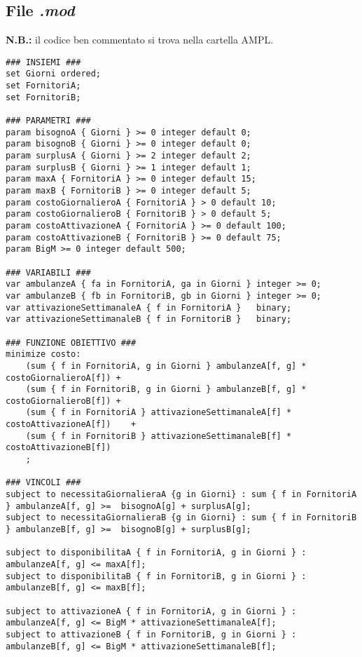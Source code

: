\subsection{File \textit{.mod}}
\textbf{N.B.:} il codice ben commentato si trova nella cartella AMPL.
\begin{lstlisting}
### INSIEMI ###
set Giorni ordered;
set FornitoriA;
set FornitoriB;

### PARAMETRI ###
param bisognoA { Giorni } >= 0 integer default 0;
param bisognoB { Giorni } >= 0 integer default 0;
param surplusA { Giorni } >= 2 integer default 2;
param surplusB { Giorni } >= 1 integer default 1;
param maxA { FornitoriA } >= 0 integer default 15;
param maxB { FornitoriB } >= 0 integer default 5;
param costoGiornalieroA { FornitoriA } > 0 default 10;
param costoGiornalieroB { FornitoriB } > 0 default 5;
param costoAttivazioneA { FornitoriA } >= 0 default 100;
param costoAttivazioneB { FornitoriB } >= 0 default 75;
param BigM >= 0 integer default 500;

### VARIABILI ###
var ambulanzeA { fa in FornitoriA, ga in Giorni } integer >= 0; 
var ambulanzeB { fb in FornitoriB, gb in Giorni } integer >= 0;
var attivazioneSettimanaleA { f in FornitoriA }   binary;
var attivazioneSettimanaleB { f in FornitoriB }	  binary;

### FUNZIONE OBIETTIVO ###
minimize costo: 
    (sum { f in FornitoriA, g in Giorni } ambulanzeA[f, g] * costoGiornalieroA[f]) +
    (sum { f in FornitoriB, g in Giorni } ambulanzeB[f, g] * costoGiornalieroB[f]) +
    (sum { f in FornitoriA } attivazioneSettimanaleA[f] * costoAttivazioneA[f])	   +
    (sum { f in FornitoriB } attivazioneSettimanaleB[f] * costoAttivazioneB[f])
    ;

### VINCOLI ###
subject to necessitaGiornalieraA {g in Giorni} : sum { f in FornitoriA } ambulanzeA[f, g] >=  bisognoA[g] + surplusA[g];
subject to necessitaGiornalieraB {g in Giorni} : sum { f in FornitoriB } ambulanzeB[f, g] >=  bisognoB[g] + surplusB[g];

subject to disponibilitaA { f in FornitoriA, g in Giorni } :  ambulanzeA[f, g] <= maxA[f];
subject to disponibilitaB { f in FornitoriB, g in Giorni } :  ambulanzeB[f, g] <= maxB[f]; 

subject to attivazioneA { f in FornitoriA, g in Giorni } : ambulanzeA[f, g] <= BigM * attivazioneSettimanaleA[f];
subject to attivazioneB { f in FornitoriB, g in Giorni } : ambulanzeB[f, g] <= BigM * attivazioneSettimanaleB[f]; 

\end{lstlisting}